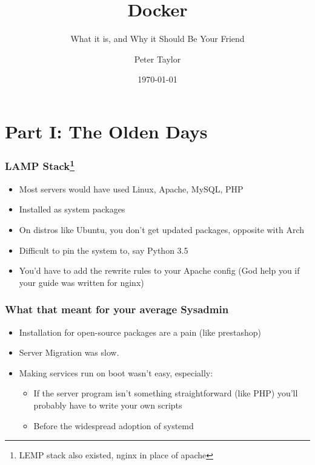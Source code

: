\documentclass[aspectratio=169]{beamer}
\title{Docker}
\subtitle{What it is, and Why it Should Be Your Friend}
\author{Peter Taylor}
\date{\today}
\newcommand{\pausefn}{}
\begin{document}
\maketitleslide

\section{Part I: The Olden Days}
\begin{frame}
  \frametitle{LAMP Stack\footnote{LEMP stack also existed, nginx in place of apache}}

  \begin{itemize}
    \pausefn\item Most servers would have used Linux, Apache, MySQL, PHP
    \pausefn\item Installed as system packages
    \pausefn\item On distros like Ubuntu, you don't get updated packages, opposite with Arch
    \pausefn\item Difficult to pin the system to, say Python 3.5
    \pausefn\item You'd have to add the rewrite rules to your Apache config (God help you if your guide was written for nginx)
  \end{itemize}
\end{frame}

\begin{frame}
  \frametitle{What that meant for your average Sysadmin}

  \begin{itemize}
    \pausefn\item Installation for open-source packages are a pain (like prestashop)
    \pausefn\item Server Migration was slow.
    \pausefn\item Making services run on boot wasn't easy, especially:
    \begin{itemize}
      \item If the server program isn't something straightforward (like PHP) you'll probably have to write your own scripts
      \item Before the widespread adoption of systemd
    \end{itemize}
  \end{itemize}
\end{frame}
\end{document}
